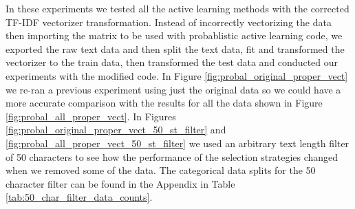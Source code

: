 In these experiments we tested all the active learning methods with the corrected TF-IDF vectorizer transformation. Instead of incorrectly vectorizing the data then importing the matrix to be used with \cite{kottke2021toward} probablistic active learning code, we exported the raw text data and then split the text data, fit and transformed the vectorizer to the train data, then transformed the test data and conducted our experiments with the modified code. In Figure \ref{fig:probal_original_proper_vect} we re-ran a previous experiment using just the original data so we could have a more accurate comparison with the results for all the data shown in Figure \ref{fig:probal_all_proper_vect}. In Figures \ref{fig:probal_original_proper_vect_50_st_filter} and \ref{fig:probal_all_proper_vect_50_st_filter} we used an arbitrary text length filter of 50 characters to see how the performance of the selection strategies changed when we removed some of the data. The categorical data splits for the 50 character filter can be found in the Appendix in Table \ref{tab:50_char_filter_data_counts}.

